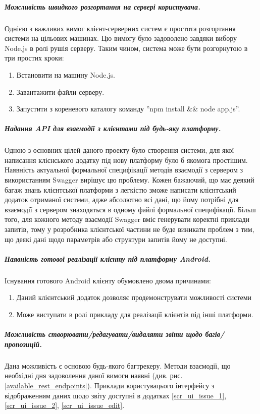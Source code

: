 \documentclass[../main.tex]{subfiles}
\begin{document}
\subparagraph{Можливість швидкого розгортання на сервері користувача.}
Однією з важливих вимог клієнт-серверних систем є простота розгортання системи на цільових машинах. Цю вимогу було задоволено завдяки вибору Node.js в ролі рушія серверу. Таким чином, система може бути розгорнутою в три простих кроки:
\begin{enumerate}
	\item Встановити на машину Node.js.
	\item Завантажити файли серверу.
	\item Запустити з кореневого каталогу команду ''npm install \&\& node app.js''.
\end{enumerate}

\subparagraph{Надання API для взаемодії з клієнтами під будь-яку платформу.}
Одною з основних цілей даного проекту було створення системи, для якої написання клієнського додатку під нову платформу було б якомога простішим. Наявність актуальної формальної специфікації методів взаємодії з сервером з використанням Swagger вирішує цю проблему. Кожен бажаючий, що має деякий багаж знань клієнтської платформи з легкістю зможе написати клієнтський додаток отриманої системи, адже абсолютно всі дані, що йому потрібні для взаємодії з сервером знаходяться в одному файлі формальної специфікації. Більш того, для кожного методу взаємодії Swagger вміє генерувати коректні приклади запитів, тому у розробника клієнтської частини не буде виникати проблем з тим, що деякі дані щодо параметрів або структури запитів йому не доступні.

\subparagraph{Наявність готової реалізації клієнту під платформу Android.}
Існування готового Android клієнту обумовлено двома причинами:
\begin{enumerate}
	\item Даний клієнтський додаток дозволяє продемонструвати можливості системи
	\item Може виступати в ролі прикладу для реалізації клієнтів під інші платформи.
\end{enumerate}

\subparagraph{Можливість створювати/редагувати/видаляти звіти щодо багів/пропозицій.}
Дана можливість є основою будь-якого багтрекеру. Методи взаємодії, що необхідні дня задоволення даної вимоги наявні (див. рис. \ref{available_rest_endpoints}). Приклади користувацього інтерфейсу з відображенням даних щодо звіту доступні в додатках \ref{scr_ui_issue_1}, \ref{scr_ui_issue_2}, \ref{scr_ui_issue_edit}.
\end{document}

